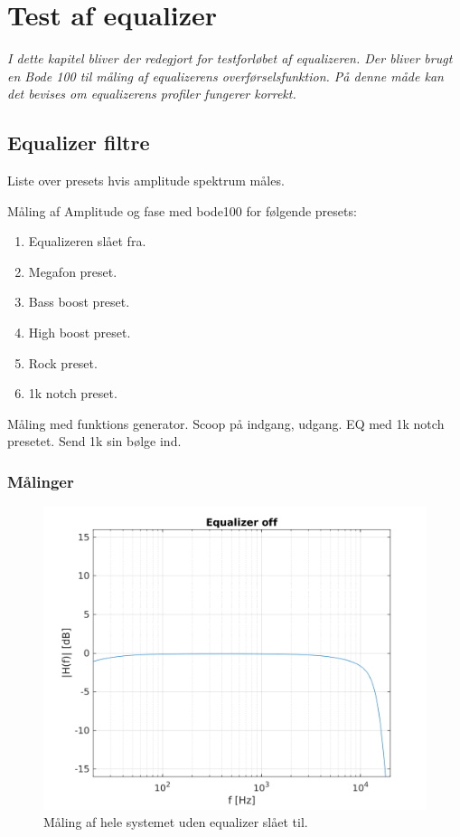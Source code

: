 \chapter{Test af equalizer}\label{sec:test_eq}




\emph{I dette kapitel bliver der redegjort for testforløbet af equalizeren. Der bliver brugt en Bode 100 til måling af equalizerens overførselsfunktion. På denne måde kan det bevises om equalizerens profiler fungerer korrekt.}

\section{Equalizer filtre}


Liste over presets hvis amplitude spektrum måles.

Måling af Amplitude og fase med bode100 for følgende presets:
\begin{enumerate}
    \item Equalizeren slået fra.
    \item Megafon preset.
    \item Bass boost preset.
    \item High boost preset.
    \item Rock preset. 
    \item 1k notch preset. \\
\end{enumerate}

Måling med funktions generator. Scoop på indgang, udgang.
EQ med 1k notch presetet. 
Send 1k sin bølge ind. 


\subsection{Målinger}


\begin{figure}[h]
\centering
\includegraphics[]{matlabdemo/test/eq_off.png}  
\caption{Måling af hele systemet uden equalizer slået til.}
\end{figure}


